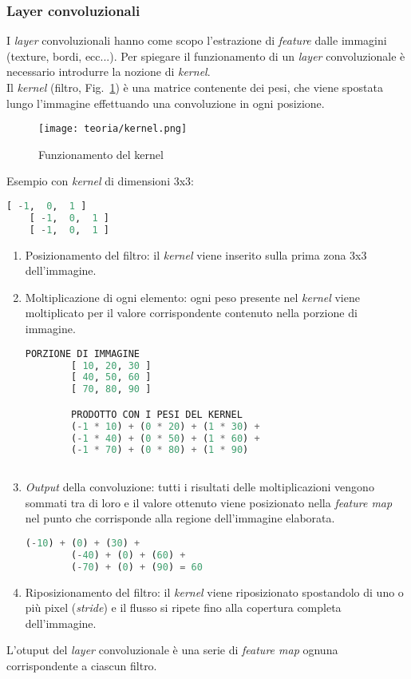 \subsubsection{Layer convoluzionali}
I \emph{layer} convoluzionali hanno come scopo l'estrazione di \emph{feature} dalle immagini (texture, bordi, ecc...).
Per spiegare il funzionamento di un \emph{layer} convoluzionale è necessario introdurre la nozione di \emph{kernel}.\\Il \emph{kernel} (filtro, Fig.~\ref{fig:kernel}) è una matrice contenente dei pesi, che viene spostata lungo l'immagine effettuando una convoluzione in ogni posizione.

\begin{figure}[!h] 
    \centering 
    \texttt{[image: teoria/kernel.png]} 
    \caption{Funzionamento del kernel}
    \label{fig:kernel}
  \end{figure}
Esempio con \emph{kernel} di dimensioni 3x3:

\begin{lstlisting}[language=Python, frame=none]
    [ -1,  0,  1 ]
    [ -1,  0,  1 ]
    [ -1,  0,  1 ]
\end{lstlisting}


\begin{enumerate}
    \item Posizionamento del filtro: il \emph{kernel} viene inserito sulla prima zona 3x3 dell'immagine.
    \item Moltiplicazione di ogni elemento: ogni peso presente nel \emph{kernel} viene moltiplicato per il valore corrispondente contenuto nella porzione di immagine.
    \newpage
    \begin{lstlisting}[language=Python, frame=none]
        PORZIONE DI IMMAGINE
        [ 10, 20, 30 ]
        [ 40, 50, 60 ]
        [ 70, 80, 90 ]

        PRODOTTO CON I PESI DEL KERNEL
        (-1 * 10) + (0 * 20) + (1 * 30) +
        (-1 * 40) + (0 * 50) + (1 * 60) +
        (-1 * 70) + (0 * 80) + (1 * 90)
            
    \end{lstlisting}
    \item \emph{Output} della convoluzione: tutti i risultati delle moltiplicazioni vengono sommati tra di loro e il valore ottenuto viene posizionato nella \emph{feature map} nel punto che corrisponde alla regione dell'immagine elaborata.
    \begin{lstlisting}[language=Python, frame=none]
        (-10) + (0) + (30) +
        (-40) + (0) + (60) +
        (-70) + (0) + (90) = 60
    \end{lstlisting}
    \item Riposizionamento del filtro: il \emph{kernel} viene riposizionato spostandolo di uno o più pixel (\emph{stride}) e il flusso si ripete fino alla copertura completa dell'immagine.
\end{enumerate}
L'otuput del \emph{layer} convoluzionale è una serie di \emph{feature map} ognuna corrispondente a ciascun filtro.

